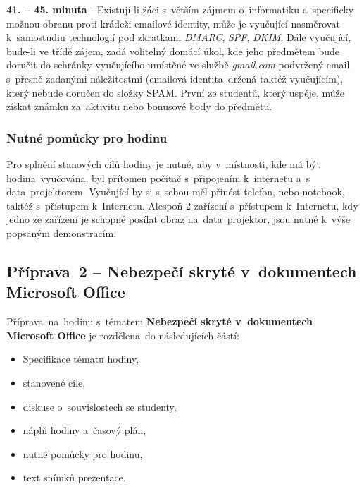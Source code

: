 \documentclass[a4paper, 12pt]{article}
\begin{document}
\textbf{41. -- 45. minuta} - Existují-li žáci s~větším zájmem o~informatiku a~specificky možnou obranu proti krádeži emailové identity, může je vyučující nasměrovat k~samostudiu technologií pod zkratkami \textit{DMARC}, \textit{SPF}, \textit{DKIM}. Dále vyučující, bude-li ve třídě zájem, zadá volitelný domácí úkol, kde jeho předmětem bude doručit do schránky vyučujícího umístěné ve službě \textit{gmail.com} podvržený email s~přesně zadanými náležitostmi (emailová identita~držená taktéž vyučujícím), který nebude doručen do složky SPAM. První ze studentů, který uspěje, může získat známku za~aktivitu nebo bonusové body do předmětu.

\subsubsection{Nutné pomůcky pro hodinu}
Pro splnění stanových cílů hodiny je nutné, aby v~místnosti, kde má být hodina~vyučována, byl přítomen počítač s~připojením k~internetu a~s data~projektorem. Vyučující by si s~sebou měl přinést telefon, nebo notebook, taktéž s~přístupem k~Internetu. Alespoň 2 zařízení s~přístupem k~Internetu, kdy jedno ze zařízení je schopné posílat obraz na~data~projektor, jsou nutné k~výše popsaným demonstracím.


\subsection{Příprava~2 -- Nebezpečí skryté v~dokumentech Microsoft Office}
Příprava~na~hodinu s~tématem \textbf{Nebezpečí skryté v~dokumentech Microsoft Office} je rozdělena~do následujících částí:
    \begin{itemize}
        \setlength{\itemsep}{-3pt}
        \item Specifikace tématu hodiny,
        \item stanovené cíle,
        \item diskuse o~souvislostech se studenty,
        \item náplň hodiny a~časový plán,
        \item nutné pomůcky pro hodinu,
        \item text snímků prezentace.
    \end{itemize}
\end{document}

